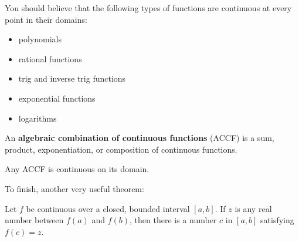 You should believe that the following types of functions are continuous at every point in their domains:
\begin{itemize}
\item polynomials
\item rational functions
\item trig and inverse trig functions
\item exponential functions
\item logarithms
\end{itemize}

An \textbf{algebraic combination of continuous functions} (ACCF) is a sum, product, exponentiation, or composition of continuous functions.

\begin{thm}
Any ACCF is continuous on its domain.
\end{thm}


To finish, another very useful theorem:

\begin{thm}
Let $f$ be continuous over a closed, bounded interval $[a, b]$. If $z$ is any real number between $f(a)$ and $f(b)$, then there is a number $c$ in $[a, b]$ satisfying $f(c)=z$.
\end{thm}

